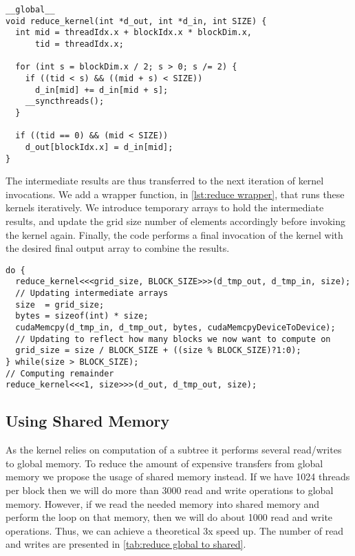 \begin{lstlisting}[caption={Reduce kernel}, label={lst:reduce par}]
__global__
void reduce_kernel(int *d_out, int *d_in, int SIZE) {
  int mid = threadIdx.x + blockIdx.x * blockDim.x,
      tid = threadIdx.x;

  for (int s = blockDim.x / 2; s > 0; s /= 2) {
    if ((tid < s) && ((mid + s) < SIZE))
      d_in[mid] += d_in[mid + s];
    __syncthreads();
  }

  if ((tid == 0) && (mid < SIZE))
    d_out[blockIdx.x] = d_in[mid];
}
\end{lstlisting}

The intermediate results are thus transferred to the next iteration of kernel invocations.
We add a wrapper function, in \cref{lst:reduce wrapper}, that runs these kernels iteratively.
We introduce temporary arrays to hold the intermediate results, and update the grid size number of elements accordingly before invoking the kernel again.
Finally, the code performs a final invocation of the kernel with the desired final output array to combine the results.

\begin{lstlisting}[caption={The loop in the wrapper for the reduce kernel}, label={lst:reduce wrapper}]
do {
  reduce_kernel<<<grid_size, BLOCK_SIZE>>>(d_tmp_out, d_tmp_in, size);
  // Updating intermediate arrays
  size  = grid_size;
  bytes = sizeof(int) * size;
  cudaMemcpy(d_tmp_in, d_tmp_out, bytes, cudaMemcpyDeviceToDevice);
  // Updating to reflect how many blocks we now want to compute on
  grid_size = size / BLOCK_SIZE + ((size % BLOCK_SIZE)?1:0);
} while(size > BLOCK_SIZE);
// Computing remainder
reduce_kernel<<<1, size>>>(d_out, d_tmp_out, size);
\end{lstlisting}

\subsection{Using Shared Memory}
\label{sec: reduce shared memory}

As the kernel relies on computation of a subtree it performs several read/writes to global memory.
To reduce the amount of expensive transfers from global memory we propose the usage of shared memory instead.
If we have 1024 threads per block then we will do more than 3000 read and write operations to global memory.
However, if we read the needed memory into shared memory and perform the loop on that memory, then we will do about 1000 read and write operations.
Thus, we can achieve a theoretical 3x speed up.
The number of read and writes are presented in \cref{tab:reduce global to shared}.

